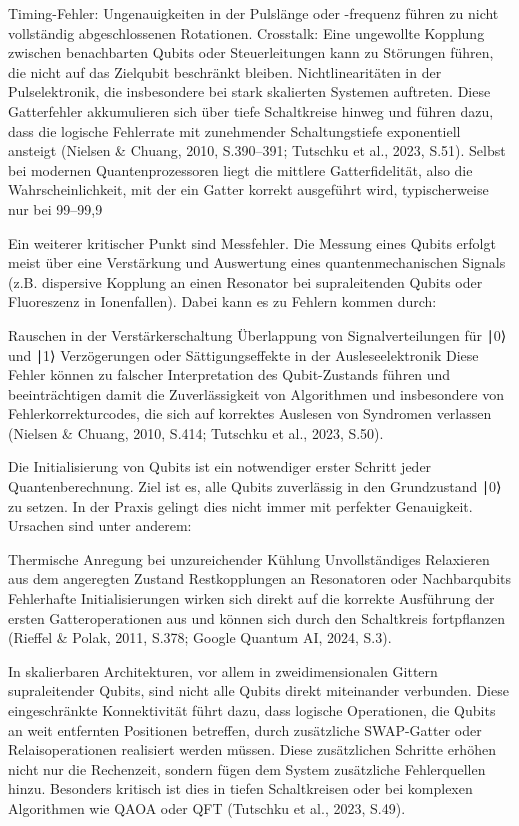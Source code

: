 Timing-Fehler: Ungenauigkeiten in der Pulslänge oder -frequenz führen zu nicht vollständig abgeschlossenen Rotationen.
Crosstalk: Eine ungewollte Kopplung zwischen benachbarten Qubits oder Steuerleitungen kann zu Störungen führen, die nicht auf das Zielqubit beschränkt bleiben.
Nichtlinearitäten in der Pulselektronik, die insbesondere bei stark skalierten Systemen auftreten.
Diese Gatterfehler akkumulieren sich über tiefe Schaltkreise hinweg und führen dazu, dass die logische Fehlerrate mit zunehmender Schaltungstiefe exponentiell ansteigt (Nielsen & Chuang, 2010, S.390–391; Tutschku et al., 2023, S.51). Selbst bei modernen Quantenprozessoren liegt die mittlere Gatterfidelität, also die Wahrscheinlichkeit, mit der ein Gatter korrekt ausgeführt wird, typischerweise nur bei 99–99,9%

Ein weiterer kritischer Punkt sind Messfehler. Die Messung eines Qubits erfolgt meist über eine Verstärkung und Auswertung eines quantenmechanischen Signals (z.B. dispersive Kopplung an einen Resonator bei supraleitenden Qubits oder Fluoreszenz in Ionenfallen). Dabei kann es zu Fehlern kommen durch:

Rauschen in der Verstärkerschaltung
Überlappung von Signalverteilungen für 
∣0⟩ und ∣1⟩
Verzögerungen oder Sättigungseffekte in der Ausleseelektronik
Diese Fehler können zu falscher Interpretation des Qubit-Zustands führen und beeinträchtigen damit die Zuverlässigkeit von Algorithmen und insbesondere von Fehlerkorrekturcodes, die sich auf korrektes Auslesen von Syndromen verlassen (Nielsen & Chuang, 2010, S.414; Tutschku et al., 2023, S.50).

Die Initialisierung von Qubits ist ein notwendiger erster Schritt jeder Quantenberechnung. Ziel ist es, alle Qubits zuverlässig in den Grundzustand ∣0⟩ zu setzen. In der Praxis gelingt dies nicht immer mit perfekter Genauigkeit. Ursachen sind unter anderem:

Thermische Anregung bei unzureichender Kühlung
Unvollständiges Relaxieren aus dem angeregten Zustand
Restkopplungen an Resonatoren oder Nachbarqubits
Fehlerhafte Initialisierungen wirken sich direkt auf die korrekte Ausführung der ersten Gatteroperationen aus und können sich durch den Schaltkreis fortpflanzen (Rieffel & Polak, 2011, S.378; Google Quantum AI, 2024, S.3).

In skalierbaren Architekturen, vor allem in zweidimensionalen Gittern supraleitender Qubits, sind nicht alle Qubits direkt miteinander verbunden. Diese eingeschränkte Konnektivität führt dazu, dass logische Operationen, die Qubits an weit entfernten Positionen betreffen, durch zusätzliche SWAP-Gatter oder Relaisoperationen realisiert werden müssen. Diese zusätzlichen Schritte erhöhen nicht nur die Rechenzeit, sondern fügen dem System zusätzliche Fehlerquellen hinzu. Besonders kritisch ist dies in tiefen Schaltkreisen oder bei komplexen Algorithmen wie QAOA oder QFT (Tutschku et al., 2023, S.49).

